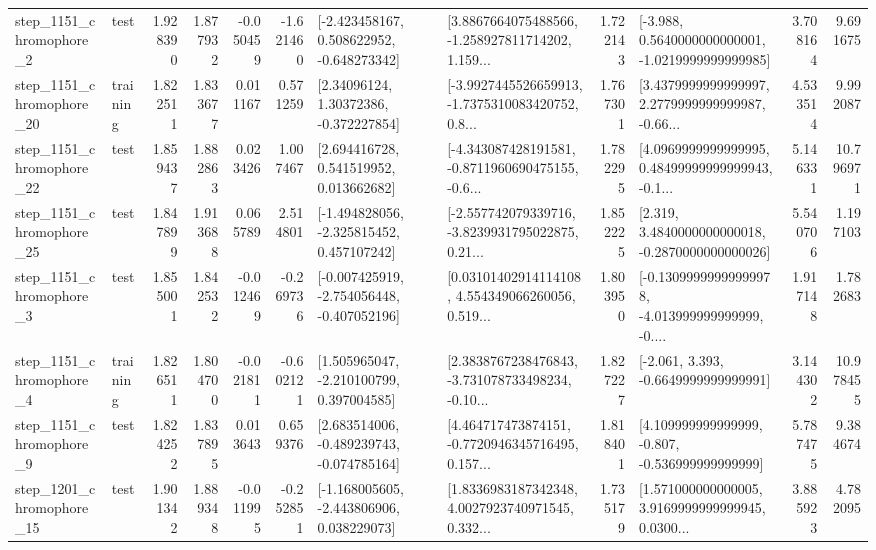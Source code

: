 \begin{tabular}{llrrrrllrlrr}
  step\_1151\_chromophore\_2 &      test &      1.928390 &    1.877932 &     -0.050459 & -1.621460 &   [-2.423458167, 0.508622952, -0.648273342] &  [3.8867664075488566, -1.258927811714202, 1.159... &       1.722143 &  [-3.988, 0.5640000000000001, -1.0219999999999985] &            3.708164 &          9.691675 \\
 step\_1151\_chromophore\_20 &  training &      1.822511 &    1.833677 &      0.011167 &  0.571259 &      [2.34096124, 1.30372386, -0.372227854] &  [-3.9927445526659913, -1.7375310083420752, 0.8... &       1.767301 &  [3.4379999999999997, 2.2779999999999987, -0.66... &            4.533514 &          9.992087 \\
 step\_1151\_chromophore\_22 &      test &      1.859437 &    1.882863 &      0.023426 &  1.007467 &     [2.694416728, 0.541519952, 0.013662682] &  [-4.343087428191581, -0.8711960690475155, -0.6... &       1.782295 &  [4.0969999999999995, 0.48499999999999943, -0.1... &            5.146331 &         10.796971 \\
 step\_1151\_chromophore\_25 &      test &      1.847899 &    1.913688 &      0.065789 &  2.514801 &   [-1.494828056, -2.325815452, 0.457107242] &  [-2.557742079339716, -3.8239931795022875, 0.21... &       1.852225 &   [2.319, 3.4840000000000018, -0.2870000000000026] &            5.540706 &          1.197103 \\
  step\_1151\_chromophore\_3 &      test &      1.855001 &    1.842532 &     -0.012469 & -0.269736 &  [-0.007425919, -2.754056448, -0.407052196] &  [0.03101402914114108, 4.554349066260056, 0.519... &       1.803950 &  [-0.13099999999999978, -4.013999999999999, -0.... &            1.917148 &          1.782683 \\
  step\_1151\_chromophore\_4 &  training &      1.826511 &    1.804700 &     -0.021811 & -0.602121 &    [1.505965047, -2.210100799, 0.397004585] &  [2.3838767238476843, -3.731078733498234, -0.10... &       1.827227 &               [-2.061, 3.393, -0.6649999999999991] &            3.144302 &         10.978455 \\
  step\_1151\_chromophore\_9 &      test &      1.824252 &    1.837895 &      0.013643 &  0.659376 &   [2.683514006, -0.489239743, -0.074785164] &  [4.464717473874151, -0.7720946345716495, 0.157... &       1.818401 &    [4.109999999999999, -0.807, -0.536999999999999] &            5.787475 &          9.384674 \\
 step\_1201\_chromophore\_15 &      test &      1.901342 &    1.889348 &     -0.011995 & -0.252851 &   [-1.168005605, -2.443806906, 0.038229073] &  [1.8336983187342348, 4.0027923740971545, 0.332... &       1.735179 &  [1.571000000000005, 3.9169999999999945, 0.0300... &            3.885923 &          4.782095 \\

\end{tabular}
